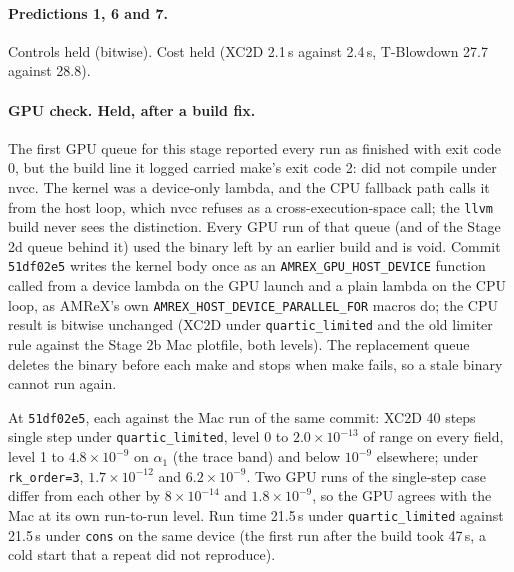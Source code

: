 \documentclass[11pt,a4paper]{article}
\newcommand{\code}[1]{\texttt{\small #1}}
\begin{document}
\paragraph{Predictions 1, 6 and 7.}  Controls held (bitwise).  Cost held
(XC2D 2.1\,s against 2.4\,s, T-Blowdown 27.7 against 28.8).

\paragraph{GPU check.  Held, after a build fix.}  The first GPU queue
for this stage reported every run as finished with exit code 0, but
the build line it logged carried make's exit code 2: 
did not compile under nvcc.  The kernel was a device-only lambda, and the
CPU fallback path calls it from the host loop, which nvcc refuses as a
cross-execution-space call; the \code{llvm} build never sees the
distinction.  Every GPU run of that queue (and of the Stage 2d queue
behind it) used the binary left by an earlier build and is void.
Commit \code{51df02e5} writes the kernel body once as an
\code{AMREX\_GPU\_HOST\_DEVICE} function called from a device lambda
on the GPU launch and a plain lambda on the CPU loop, as AMReX's own
\code{AMREX\_HOST\_DEVICE\_PARALLEL\_FOR} macros do; the CPU result is
bitwise unchanged (XC2D under \code{quartic\_limited} and the old
limiter rule against the Stage 2b Mac plotfile, both levels).  The
replacement queue deletes the binary before each make and stops when
make fails, so a stale binary cannot run again.

At \code{51df02e5}, each against the Mac run of the same commit: XC2D 40
steps single step under \code{quartic\_limited}, level 0 to
$2.0\times10^{-13}$ of range on every field, level 1 to
$4.8\times10^{-9}$ on $\alpha_1$ (the trace band) and below $10^{-9}$
elsewhere; under \code{rk\_order=3}, $1.7\times10^{-12}$ and
$6.2\times10^{-9}$.  Two GPU runs of the single-step case differ from
each other by $8\times10^{-14}$ and $1.8\times10^{-9}$, so the GPU
agrees with the Mac at its own run-to-run level.  Run time 21.5\,s
under \code{quartic\_limited} against 21.5\,s under \code{cons} on the
same device (the first run after the build took 47\,s, a cold start
that a repeat did not reproduce).
\end{document}
